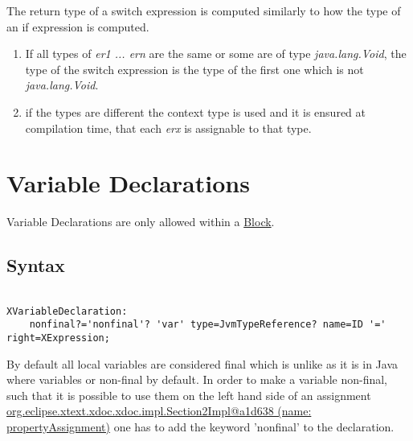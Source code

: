 \documentclass[a4paper,10pt]{scrreprt}
\newlength{\itemindentlen}
\begin{document}
The return type of a switch expression is computed similarly to how the type of an if expression is computed. 

\setlength{\itemindentlen}{\textwidth}
\begin{enumerate}
\addtolength{\itemindentlen}{-2em}

\item \begin{minipage}[t]{\itemindentlen}
If all types of \emph{er1 ... ern} are the same or some are of type \emph{java.lang.Void}, the type of the switch expression is the type of the first one which is not \emph{java.lang.Void}.
\end{minipage}

\item \begin{minipage}[t]{\itemindentlen}
if the types are different the context type is used and it is ensured at compilation time, that each \emph{erx} is assignable to that type.
\end{minipage}

\end{enumerate}
\addtolength{\itemindentlen}{2em}







\section{Variable Declarations}
\label{VariableDeclaration}

Variable Declarations are only allowed within a 
\hyperref[Blocks]{Block}. 

\subsection{ Syntax }


\begin{lstlisting}

XVariableDeclaration:
	nonfinal?='nonfinal'? 'var' type=JvmTypeReference? name=ID '=' right=XExpression;

\end{lstlisting}


By default all local variables are considered final which is unlike as it is in Java where variables or non-final by default.
In order to make a variable non-final, such that it is possible to use them on the left hand side of an assignment 
\hyperref[propertyAssignment]{org.eclipse.xtext.xdoc.xdoc.impl.Section2Impl@a1d638 (name: propertyAssignment)} one has to add the keyword 'nonfinal' to the declaration.
\end{document}
